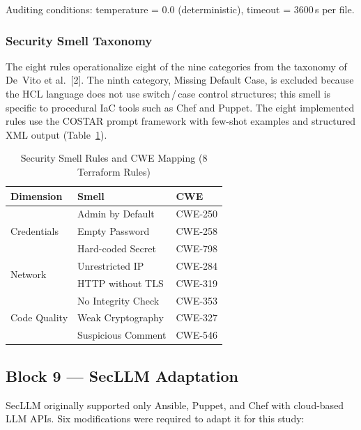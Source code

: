 Auditing conditions: temperature = 0.0 (deterministic), timeout =
3600\,s per file.

\subsubsection{Security Smell Taxonomy}

The eight rules operationalize eight of the nine categories from the
taxonomy of De~Vito et al.~[2]. The ninth category, Missing Default
Case, is excluded because the HCL language does not use
switch\,/\,case control structures; this smell is specific to
procedural IaC tools such as Chef and Puppet. The eight implemented
rules use the COSTAR prompt framework with few-shot examples and
structured XML output (Table~\ref{tab:smells}).

\begin{table}[htbp]
\centering
\caption{Security Smell Rules and CWE Mapping (8 Terraform Rules)}
\label{tab:smells}
\begin{tabular}{@{}lll@{}}
\toprule
\textbf{Dimension} & \textbf{Smell} & \textbf{CWE} \\
\midrule
\multirow{3}{*}{Credentials}
  & Admin by Default    & CWE-250 \\
  & Empty Password      & CWE-258 \\
  & Hard-coded Secret   & CWE-798 \\
\midrule
\multirow{2}{*}{Network}
  & Unrestricted IP     & CWE-284 \\
  & HTTP without TLS    & CWE-319 \\
\midrule
\multirow{3}{*}{Code Quality}
  & No Integrity Check  & CWE-353 \\
  & Weak Cryptography   & CWE-327 \\
  & Suspicious Comment  & CWE-546 \\
\bottomrule
\end{tabular}
\end{table}

\subsection{Block 9 --- SecLLM Adaptation}
\label{sec:block9}

SecLLM originally supported only Ansible, Puppet, and Chef with
cloud-based LLM APIs. Six modifications were required to adapt it
for this study:

